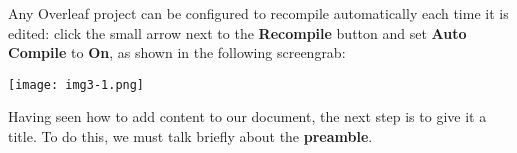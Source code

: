 Any Overleaf project can be configured to recompile automatically each time it is edited: click the small arrow next to the \textbf{Recompile} button and set \textbf{Auto Compile} to \textbf{On}, as shown in the following screengrab:

\texttt{[image: img3-1.png]}

Having seen how to add content to our document, the next step is to give it a title. To do this, we must talk briefly about the \textbf{preamble}.